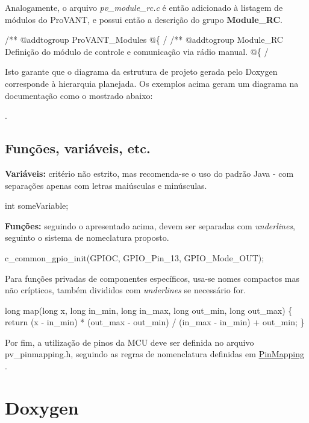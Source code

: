 Analogamente, o arquivo {\itshape pv\-\_\-module\-\_\-rc.\-c} é então adicionado à listagem de módulos do Pro\-V\-A\-N\-T, e possui então a descrição do grupo {\bfseries Module\-\_\-\-R\-C}.


\begin{DoxyCode}
\textcolor{comment}{/** @addtogroup ProVANT\_Modules}
\textcolor{comment}{    @\{}
\textcolor{comment}{   /}
\textcolor{comment}{}\textcolor{comment}{}
\textcolor{comment}{/** @addtogroup Module\_RC}
\textcolor{comment}{    Definição do módulo de controle e comunicação via rádio manual.}
\textcolor{comment}{    @\{}
\textcolor{comment}{   /}
\end{DoxyCode}


Isto garante que o diagrama da estrutura de projeto gerada pelo Doxygen corresponde à hierarquia planejada. Os exemplos acima geram um diagrama na documentação como o mostrado abaixo\-:

.\hypertarget{page_naming_page_naming_subsec_codenaming}{}\subsection{Funções, variáveis, etc.}\label{page_naming_page_naming_subsec_codenaming}
{\bfseries Variáveis\-:} critério não estrito, mas recomenda-\/se o uso do padrão Java -\/ com separações apenas com letras maiúsculas e minúsculas.


\begin{DoxyCode}
\textcolor{keywordtype}{int} someVariable; 
\end{DoxyCode}


{\bfseries Funções\-:} seguindo o apresentado acima, devem ser separadas com {\itshape underlines}, seguinto o sistema de nomeclatura proposto.


\begin{DoxyCode}
c\_common\_gpio\_init(GPIOC, GPIO\_Pin\_13, GPIO\_Mode\_OUT); 
\end{DoxyCode}
 Para funções privadas de componentes específicos, usa-\/se nomes compactos mas não crípticos, também divididos com {\itshape underlines} se necessário for. 
\begin{DoxyCode}
\textcolor{keywordtype}{long} map(\textcolor{keywordtype}{long} x, \textcolor{keywordtype}{long} in\_min, \textcolor{keywordtype}{long} in\_max, \textcolor{keywordtype}{long} out\_min, \textcolor{keywordtype}{long} out\_max) \{
    \textcolor{keywordflow}{return} (x - in\_min) * (out\_max - out\_min) / (in\_max - in\_min) + out\_min;
\} 
\end{DoxyCode}


Por fim, a utilização de pinos da M\-C\-U deve ser definida no arquivo {\ttfamily pv\-\_\-pinmapping.\-h}, seguindo as regras de nomenclatura definidas em \hyperlink{}{Pin\-Mapping } .\hypertarget{page_naming_page_naming_sec_doxygen}{}\section{Doxygen}\label{page_naming_page_naming_sec_doxygen}
